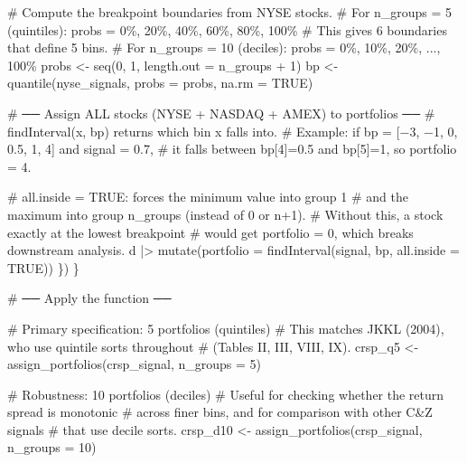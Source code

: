 \documentclass[
  letterpaper,
  DIV=11,
  numbers=noendperiod]{scrartcl}
\newenvironment{Shaded}{\begin{snugshade}}{\end{snugshade}}
\newcommand{\AttributeTok}[1]{\textcolor[rgb]{0.40,0.45,0.13}{#1}}
\newcommand{\CommentTok}[1]{\textcolor[rgb]{0.37,0.37,0.37}{#1}}
\newcommand{\ConstantTok}[1]{\textcolor[rgb]{0.56,0.35,0.01}{#1}}
\newcommand{\DecValTok}[1]{\textcolor[rgb]{0.68,0.00,0.00}{#1}}
\newcommand{\FunctionTok}[1]{\textcolor[rgb]{0.28,0.35,0.67}{#1}}
\newcommand{\NormalTok}[1]{\textcolor[rgb]{0.00,0.23,0.31}{#1}}
\newcommand{\OtherTok}[1]{\textcolor[rgb]{0.00,0.23,0.31}{#1}}
\newcommand{\SpecialCharTok}[1]{\textcolor[rgb]{0.37,0.37,0.37}{#1}}
\begin{document}
\begin{Shaded}
\begin{Highlighting}[]
    \CommentTok{\# Compute the breakpoint boundaries from NYSE stocks.}
    \CommentTok{\# For n\_groups = 5 (quintiles): probs = 0\%, 20\%, 40\%, 60\%, 80\%, 100\%}
    \CommentTok{\# This gives 6 boundaries that define 5 bins.}
    \CommentTok{\# For n\_groups = 10 (deciles): probs = 0\%, 10\%, 20\%, ..., 100\%}
\NormalTok{    probs }\OtherTok{\textless{}{-}} \FunctionTok{seq}\NormalTok{(}\DecValTok{0}\NormalTok{, }\DecValTok{1}\NormalTok{, }\AttributeTok{length.out =}\NormalTok{ n\_groups }\SpecialCharTok{+} \DecValTok{1}\NormalTok{)}
\NormalTok{    bp }\OtherTok{\textless{}{-}} \FunctionTok{quantile}\NormalTok{(nyse\_signals, }\AttributeTok{probs =}\NormalTok{ probs, }\AttributeTok{na.rm =} \ConstantTok{TRUE}\NormalTok{)}
    
    \CommentTok{\# ── Assign ALL stocks (NYSE + NASDAQ + AMEX) to portfolios ──}
    \CommentTok{\# findInterval(x, bp) returns which bin x falls into.}
    \CommentTok{\# Example: if bp = [−3, −1, 0, 0.5, 1, 4] and signal = 0.7,}
    \CommentTok{\# it falls between bp[4]=0.5 and bp[5]=1, so portfolio = 4.}
  
    \CommentTok{\# all.inside = TRUE: forces the minimum value into group 1}
    \CommentTok{\# and the maximum into group n\_groups (instead of 0 or n+1).}
    \CommentTok{\# Without this, a stock exactly at the lowest breakpoint}
    \CommentTok{\# would get portfolio = 0, which breaks downstream analysis.}
\NormalTok{    d }\SpecialCharTok{|\textgreater{}} \FunctionTok{mutate}\NormalTok{(}\AttributeTok{portfolio =} \FunctionTok{findInterval}\NormalTok{(signal, bp, }\AttributeTok{all.inside =} \ConstantTok{TRUE}\NormalTok{))}
\NormalTok{  \})}
\NormalTok{\}}

\CommentTok{\# ── Apply the function ──}

\CommentTok{\# Primary specification: 5 portfolios (quintiles)}
\CommentTok{\# This matches JKKL (2004), who use quintile sorts throughout}
\CommentTok{\# (Tables II, III, VIII, IX).}
\NormalTok{crsp\_q5 }\OtherTok{\textless{}{-}} \FunctionTok{assign\_portfolios}\NormalTok{(crsp\_signal, }\AttributeTok{n\_groups =} \DecValTok{5}\NormalTok{)}

\CommentTok{\# Robustness: 10 portfolios (deciles)}
\CommentTok{\# Useful for checking whether the return spread is monotonic}
\CommentTok{\# across finer bins, and for comparison with other C\&Z signals}
\CommentTok{\# that use decile sorts.}
\NormalTok{crsp\_d10 }\OtherTok{\textless{}{-}} \FunctionTok{assign\_portfolios}\NormalTok{(crsp\_signal, }\AttributeTok{n\_groups =} \DecValTok{10}\NormalTok{)}
\end{Highlighting}
\end{Shaded}
\end{document}
